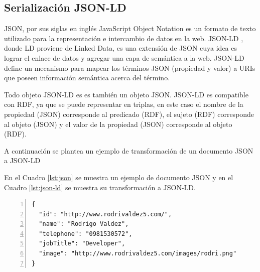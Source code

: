 \subsection{Serialización JSON-LD}

JSON, por sus siglas en inglés JavaScript Object Notation es un formato de texto utilizado para la representación e intercambio de datos en la web. JSON-LD \cite{JSONLDSy39:online}, donde LD proviene de Linked Data, es una extensión de JSON cuya idea es lograr el enlace de datos y agregar una capa de semántica a la web. JSON-LD define un mecanismo para mapear los términos JSON (propiedad y valor) a URIs que poseen información semántica acerca del término. 

Todo objeto JSON-LD es es también un objeto JSON. JSON-LD es compatible con RDF, ya que se puede representar en triplas, en este caso el nombre de la propiedad (JSON) corresponde al predicado (RDF), el sujeto (RDF) corresponde al objeto (JSON) y el valor de la propiedad (JSON) corresponde al objeto (RDF).

A continuación se plantea un ejemplo de transformación de un documento JSON a JSON-LD 

En el Cuadro \ref{lst:json} se muestra un ejemplo de documento JSON y en el Cuadro \ref{lst:json-ld} se muestra su transformación a JSON-LD.  
\newline

\lstset{
    language=json
}  


\noindent\begin{minipage}{\textwidth}
\begin{lstlisting}[captionpos=b, caption=Ejemplo de un documento JSON, label=lst:json,  numbers=left,  numberstyle=\tiny\color{mygray},
    basicstyle=\tiny,frame=single]
{
  "id": "http://www.rodrivaldez5.com/",
  "name": "Rodrigo Valdez",
  "telephone": "0981530572",
  "jobTitle": "Developer",
  "image": "http://www.rodrivaldez5.com/images/rodri.png"
}
\end{lstlisting}
\end{minipage}

